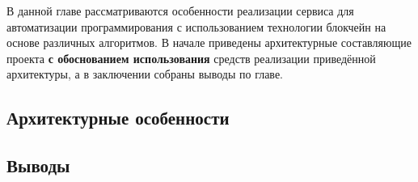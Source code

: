 В данной главе рассматриваются особенности реализации сервиса для
автоматизации программирования с использованием технологии блокчейн на основе
различных алгоритмов. В начале приведены архитектурные составляющие проекта
\textbf{с обоснованием использования} средств реализации приведённой
архитектуры, а в заключении собраны выводы по главе.

\subsection{Архитектурные особенности}


\newpage
\subsection{Выводы}

